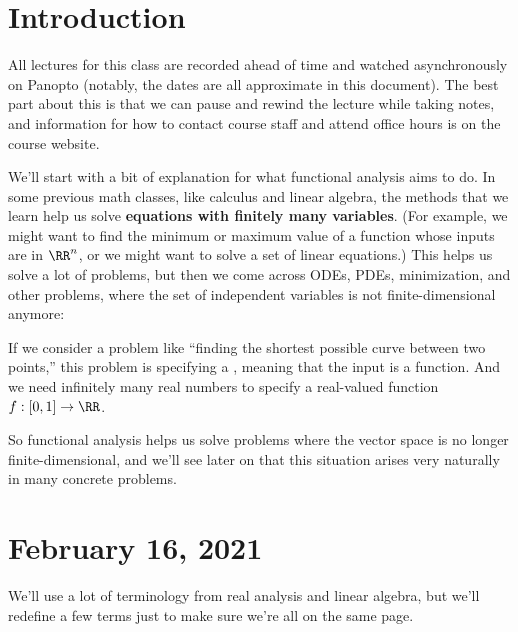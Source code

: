 
\section*{Introduction}

\begin{fact}
All lectures for this class are recorded ahead of time and watched asynchronously on Panopto (notably, the dates are all approximate in this document). The best part about this is that we can pause and rewind the lecture while taking notes, and information for how to contact course staff and attend office hours is on the course website.
\end{fact}

We'll start with a bit of explanation for what functional analysis aims to do. In some previous math classes, like calculus and linear algebra, the methods that we learn help us solve \textbf{equations with finitely many variables}. (For example, we might want to find the minimum or maximum value of a function whose inputs are in $\RR^n$, or we might want to solve a set of linear equations.) This helps us solve a lot of problems, but then we come across ODEs, PDEs, minimization, and other problems, where the set of independent variables is not finite-dimensional anymore:

\begin{example}
If we consider a problem like ``finding the shortest possible curve between two points,'' this problem is specifying a , meaning that the input is a function. And we need infinitely many real numbers to specify a real-valued function $f: [0, 1] \to \RR$.
\end{example}

So functional analysis helps us solve problems where the vector space is no longer finite-dimensional, and we'll see later on that this situation arises very naturally in many concrete problems.

\section*{February 16, 2021}

We'll use a lot of terminology from real analysis and linear algebra, but we'll redefine a few terms just to make sure we're all on the same page.

